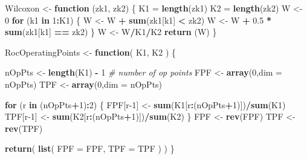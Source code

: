 \documentclass[
]{book}
\newenvironment{Shaded}{\begin{snugshade}}{\end{snugshade}}
\newcommand{\CommentTok}[1]{\textcolor[rgb]{0.56,0.35,0.01}{\textit{#1}}}
\newcommand{\ControlFlowTok}[1]{\textcolor[rgb]{0.13,0.29,0.53}{\textbf{#1}}}
\newcommand{\DataTypeTok}[1]{\textcolor[rgb]{0.13,0.29,0.53}{#1}}
\newcommand{\DecValTok}[1]{\textcolor[rgb]{0.00,0.00,0.81}{#1}}
\newcommand{\FloatTok}[1]{\textcolor[rgb]{0.00,0.00,0.81}{#1}}
\newcommand{\KeywordTok}[1]{\textcolor[rgb]{0.13,0.29,0.53}{\textbf{#1}}}
\newcommand{\NormalTok}[1]{#1}
\newcommand{\OperatorTok}[1]{\textcolor[rgb]{0.81,0.36,0.00}{\textbf{#1}}}
\newcommand{\StringTok}[1]{\textcolor[rgb]{0.31,0.60,0.02}{#1}}
\begin{document}
\begin{Shaded}
\begin{Highlighting}[]
\NormalTok{Wilcoxon <-}\StringTok{ }\ControlFlowTok{function}\NormalTok{ (zk1, zk2)}
\NormalTok{\{}
\NormalTok{  K1 =}\StringTok{ }\KeywordTok{length}\NormalTok{(zk1)}
\NormalTok{  K2 =}\StringTok{ }\KeywordTok{length}\NormalTok{(zk2)}
\NormalTok{  W <-}\StringTok{ }\DecValTok{0}
  \ControlFlowTok{for}\NormalTok{ (k1 }\ControlFlowTok{in} \DecValTok{1}\OperatorTok{:}\NormalTok{K1) \{}
\NormalTok{    W <-}\StringTok{ }\NormalTok{W }\OperatorTok{+}\StringTok{ }\KeywordTok{sum}\NormalTok{(zk1[k1] }\OperatorTok{<}\StringTok{ }\NormalTok{zk2)}
\NormalTok{    W <-}\StringTok{ }\NormalTok{W }\OperatorTok{+}\StringTok{ }\FloatTok{0.5} \OperatorTok{*}\StringTok{ }\KeywordTok{sum}\NormalTok{(zk1[k1] }\OperatorTok{==}\StringTok{ }\NormalTok{zk2)}
\NormalTok{  \}}
\NormalTok{  W <-}\StringTok{ }\NormalTok{W}\OperatorTok{/}\NormalTok{K1}\OperatorTok{/}\NormalTok{K2}
  \KeywordTok{return}\NormalTok{ (W)}
\NormalTok{\}}

\NormalTok{RocOperatingPoints <-}\StringTok{ }\ControlFlowTok{function}\NormalTok{( K1, K2 ) \{}
  
\NormalTok{  nOpPts <-}\StringTok{ }\KeywordTok{length}\NormalTok{(K1) }\OperatorTok{-}\StringTok{ }\DecValTok{1} \CommentTok{# number of op points}
\NormalTok{  FPF <-}\StringTok{ }\KeywordTok{array}\NormalTok{(}\DecValTok{0}\NormalTok{,}\DataTypeTok{dim =}\NormalTok{ nOpPts)}
\NormalTok{  TPF <-}\StringTok{ }\KeywordTok{array}\NormalTok{(}\DecValTok{0}\NormalTok{,}\DataTypeTok{dim =}\NormalTok{ nOpPts)}
   
  \ControlFlowTok{for}\NormalTok{ (r }\ControlFlowTok{in}\NormalTok{ (nOpPts}\OperatorTok{+}\DecValTok{1}\NormalTok{)}\OperatorTok{:}\DecValTok{2}\NormalTok{) \{}
\NormalTok{    FPF[r}\DecValTok{-1}\NormalTok{] <-}\StringTok{ }\KeywordTok{sum}\NormalTok{(K1[r}\OperatorTok{:}\NormalTok{(nOpPts}\OperatorTok{+}\DecValTok{1}\NormalTok{)])}\OperatorTok{/}\KeywordTok{sum}\NormalTok{(K1)}
\NormalTok{    TPF[r}\DecValTok{-1}\NormalTok{] <-}\StringTok{ }\KeywordTok{sum}\NormalTok{(K2[r}\OperatorTok{:}\NormalTok{(nOpPts}\OperatorTok{+}\DecValTok{1}\NormalTok{)])}\OperatorTok{/}\KeywordTok{sum}\NormalTok{(K2)    }
\NormalTok{  \}}
\NormalTok{  FPF <-}\StringTok{ }\KeywordTok{rev}\NormalTok{(FPF)}
\NormalTok{  TPF <-}\StringTok{ }\KeywordTok{rev}\NormalTok{(TPF)}
  
  \KeywordTok{return}\NormalTok{( }\KeywordTok{list}\NormalTok{(}
    \DataTypeTok{FPF =}\NormalTok{ FPF,}
    \DataTypeTok{TPF =}\NormalTok{ TPF}
\NormalTok{  ) )}
\NormalTok{\}}
\end{Highlighting}
\end{Shaded}
\end{document}

